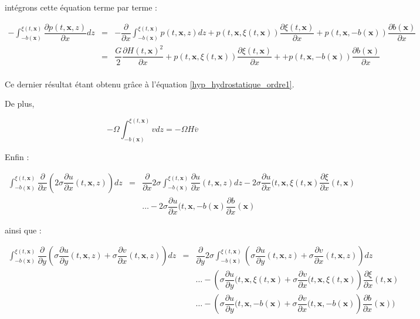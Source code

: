 \documentclass[10pt,a4paper]{amsart}
\def\gint{\displaystyle\int}
\begin{document}
intégrons cette équation terme par terme :

\begin{eqnarray*}
-\gint_{-b(\mathbf{x})}^{\xi(t, \mathbf{x})} \dfrac{\partial p(t, \mathbf{x}, z)}{\partial x}dz & = & - \dfrac{\partial}{\partial x} \gint_{-b(\mathbf{x})}^{\xi(t, \mathbf{x})} p(t, \mathbf{x}, z) dz + p(t, \mathbf{x}, \xi(t, \mathbf{x})) \dfrac{\partial \xi(t, \mathbf{x})}{\partial x} + p(t, \mathbf{x}, -b(\mathbf{x})) \dfrac{\partial b(\mathbf{x})}{\partial x}\\
& = & \dfrac{G}{2} \dfrac{\partial H(t, \mathbf{x})^2}{\partial x}+ p(t, \mathbf{x}, \xi(t, \mathbf{x})) \dfrac{\partial \xi(t, \mathbf{x})}{\partial x} + + p(t, \mathbf{x}, -b(\mathbf{x})) \dfrac{\partial b(\mathbf{x})}{\partial x}\\
\end{eqnarray*}

Ce dernier résultat étant obtenu grâce à l'équation \eqref{hyp_hydrostatique_ordre1}.

De plus, 

$$- \Omega \gint_{-b(\mathbf{x})}^{\xi(t, \mathbf{x})} v dz = - \Omega H \overline{v} $$

Enfin :

\begin{eqnarray*}
\gint_{-b(\mathbf{x})}^{\xi(t, \mathbf{x})} \dfrac{\partial}{\partial x} \left( 2 \sigma \dfrac{\partial u}{\partial x}(t, \mathbf{x}, z) \right) dz & = & \dfrac{\partial}{\partial x} 2 \sigma \gint_{-b(\mathbf{x})}^{\xi(t, \mathbf{x})} \dfrac{\partial u}{\partial x}(t, \mathbf{x}, z) dz - 2 \sigma \dfrac{\partial u}{\partial x}(t, \mathbf{x}, \xi(t, \mathbf{x}) \dfrac{\partial \xi}{\partial x}(t, \mathbf{x})\\
&  & \ldots - 2 \sigma \dfrac{\partial u}{\partial x}(t, \mathbf{x}, -b(\mathbf{x}) \dfrac{\partial b}{\partial x}(\mathbf{x})
\end{eqnarray*}

ainsi que :

\begin{eqnarray*}
\gint_{-b(\mathbf{x})}^{\xi(t, \mathbf{x})} \dfrac{\partial}{\partial y} \left( \sigma \dfrac{\partial u}{\partial y}(t, \mathbf{x}, z) + \sigma \dfrac{\partial v}{\partial x}(t, \mathbf{x}, z) \right) dz & = & \dfrac{\partial}{\partial y} 2 \sigma \gint_{-b(\mathbf{x})}^{\xi(t, \mathbf{x})} \left( \sigma \dfrac{\partial u}{\partial y}(t, \mathbf{x}, z) + \sigma \dfrac{\partial v}{\partial x}(t, \mathbf{x}, z) \right) dz\\
&  & \ldots - \left( \sigma \dfrac{\partial u}{\partial y}(t, \mathbf{x}, \xi(t, \mathbf{x}) + \sigma \dfrac{\partial v}{\partial x}(t, \mathbf{x}, \xi(t, \mathbf{x}) \right)\dfrac{\partial \xi}{\partial x}(t, \mathbf{x})\\
&  & \ldots - \left( \sigma \dfrac{\partial u}{\partial y}(t, \mathbf{x}, -b(\mathbf{x}) + \sigma \dfrac{\partial v}{\partial x}(t, \mathbf{x}, -b( \mathbf{x}) \right)\dfrac{\partial b}{\partial x}(\mathbf{x}))\\
\end{eqnarray*}
\end{document}
